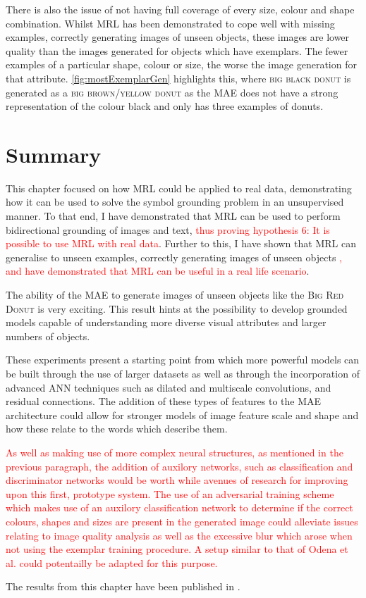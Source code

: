 There is also the issue of not having full coverage of every size, colour and shape combination. Whilst \ac{MRL} has been demonstrated to cope well with missing examples, correctly generating images of unseen objects, these images are lower quality than the images generated for objects which have exemplars. The fewer examples of a particular shape, colour or size, the worse the image generation for that attribute. \autoref{fig:mostExemplarGen} highlights this, where \textsc{big black donut} is generated as a \textsc{big brown/yellow donut} as the MAE does not have a strong representation of the colour black and only has three examples of donuts.



\section{Summary}
This chapter focused on how \ac{MRL} could be applied to real data, demonstrating how it can be used to solve the symbol grounding problem in an unsupervised manner.
To that end, I have demonstrated that \ac{MRL} can be used to perform bidirectional grounding of images and text, \textcolor{red}{thus proving hypothesis 6: It is possible to use \ac{MRL} with real data}. Further to this, I have shown that \ac{MRL} can generalise to unseen examples, correctly generating images of unseen objects \textcolor{red}{, and have demonstrated that \ac{MRL} can be useful in a real life scenario}.

The ability of the \ac{MAE} to generate images of unseen objects like the \textsc{Big Red Donut} is very exciting. This result hints at the possibility to develop grounded models capable of understanding more diverse visual attributes and larger numbers of objects.

These experiments present a starting point from which more powerful models can be built through the use of larger datasets as well as through the incorporation of advanced  \ac{ANN} techniques such as dilated and multiscale convolutions, and residual connections. The addition of these types of features to the \ac{MAE} architecture could allow for stronger models of image feature scale and shape and how these relate to the words which describe them.

\textcolor{red}{As well as making use of more complex neural structures, as mentioned in the previous paragraph, the addition of auxilory networks, such as classification and discriminator networks would be worth while avenues of research for improving upon this first, prototype system. The use of an adversarial training scheme which makes use of an auxilory classification network to determine if the correct colours, shapes and sizes are present in the generated image could alleviate issues relating to image quality analysis as well as the excessive blur which arose when not using the exemplar training procedure. A setup similar to that of Odena et al. \cite{odena2017conditional} could potentailly be adapted for this purpose.}

The results from this chapter have been published in \cite{sheppard2020multimodal}.
